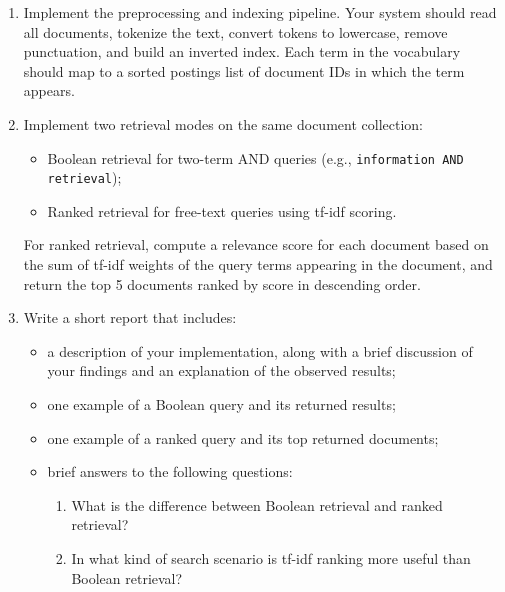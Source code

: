 \documentclass{article}
\begin{document}
\begin{enumerate}
    \item Implement the preprocessing and indexing pipeline. Your system should read all documents, tokenize the text, convert tokens to lowercase, remove punctuation, and build an inverted index. Each term in the vocabulary should map to a sorted postings list of document IDs in which the term appears.

    \item Implement two retrieval modes on the same document collection:
    \begin{itemize}
        \item Boolean retrieval for two-term AND queries (e.g., \texttt{information AND retrieval});
        \item Ranked retrieval for free-text queries using tf-idf scoring.
    \end{itemize}
    For ranked retrieval, compute a relevance score for each document based on the sum of tf-idf weights of the query terms appearing in the document, and return the top 5 documents ranked by score in descending order.

    \item Write a short report that includes:
    \begin{itemize}
        \item a description of your implementation, along with a brief discussion of your findings and an explanation of the observed results;
        \item one example of a Boolean query and its returned results;
        \item one example of a ranked query and its top returned documents;
        \item brief answers to the following questions:
        \begin{enumerate}
            \item What is the difference between Boolean retrieval and ranked retrieval?
            \item In what kind of search scenario is tf-idf ranking more useful than Boolean retrieval?
        \end{enumerate}
    \end{itemize}
\end{enumerate}

\vspace{0.8em}
\end{document}
